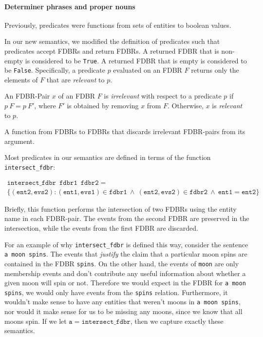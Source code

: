 \documentclass[../main.tex]{subfiles}
\begin{document}
\paragraph{Determiner phrases and proper nouns}
Previously, predicates were functions from sets of entities to boolean values.

In our new semantics, we modified the definition of predicates such that predicates accept FDBRs and return FDBRs.
A returned FDBR that is non-empty is considered to be \texttt{True}.  A returned FDBR that is empty is considered to be \texttt{False}.
Specifically, a predicate $p$ evaluated on an FDBR $F$ returns only the elements of $F$ that are {\em relevant} to $p$.

\begin{definition}
	An FDBR-Pair $x$ of an FDBR $F$ is {\em irrelevant} with respect to a predicate $p$ if $p\ F = p\ F'$, where $F'$ is obtained by removing $x$ from $F$.  Otherwise,
	$x$ is {\em relevant} to $p$.
\end{definition}

\begin{definition}[Predicate]
	A function from FDBRs to FDBRs that discards irrelevant FDBR-pairs from its argument.
\end{definition}

Most predicates in our semantics are defined in terms of the function \texttt{intersect\_fdbr}:

\begin{definition}
	\begin{multline*}
	\mathtt{intersect\_fdbr}\enspace \mathtt{fdbr1}\enspace \mathtt{fdbr2} = \\ \{\mathtt{(ent2, evs2) : (ent1, evs1) }\in \mathtt{fdbr1 \ \wedge\ (ent2, evs2) } \in \mathtt{fdbr2\ \wedge\ ent1 = ent2}\}
	\end{multline*}
\end{definition}

Briefly, this function performs the intersection of two FDBRs using the entity name in each FDBR-pair.  The events from the second FDBR are preserved
in the intersection, while the events from the first FDBR are discarded.

For an example of why \texttt{intersect\_fdbr} is defined this way, consider the sentence
\texttt{a moon spins}.  The events that {\em justify} the claim that a particular moon spins are contained in the FDBR \texttt{spins}.  On the other hand, the events of \texttt{moon}
are only membership events and don't contribute any useful information about whether a given moon will spin or not.  Therefore we would expect in the FDBR for \texttt{a moon spins},
we would only have events from the \texttt{spins} relation.  Furthermore, it wouldn't make sense to have any entities that weren't moons in \texttt{a moon spins}, nor would
it make sense for us to be missing any moons, since we know that all moons spin.  If we let $\mathtt{a} = \mathtt{intersect\_fdbr}$, then we capture exactly these semantics.
\end{document}

